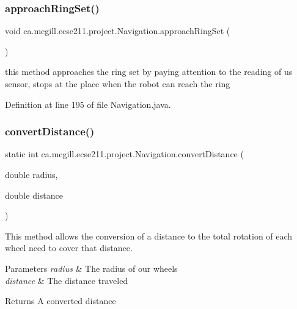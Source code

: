 \subsubsection{\texorpdfstring{approach\+Ring\+Set()}{approachRingSet()}}
{\footnotesize\ttfamily void ca.\+mcgill.\+ecse211.\+project.\+Navigation.\+approach\+Ring\+Set (\begin{DoxyParamCaption}{ }\end{DoxyParamCaption})}

this method approaches the ring set by paying attention to the reading of us sensor, stops at the place when the robot can reach the ring 

Definition at line 195 of file Navigation.\+java.

\mbox{\label{classca_1_1mcgill_1_1ecse211_1_1project_1_1_navigation_ac9e260bcd619ffa4820d7d0de7ea1c12}} 
\subsubsection{\texorpdfstring{convert\+Distance()}{convertDistance()}}
{\footnotesize\ttfamily static int ca.\+mcgill.\+ecse211.\+project.\+Navigation.\+convert\+Distance (\begin{DoxyParamCaption}\item[{double}]{radius,  }\item[{double}]{distance }\end{DoxyParamCaption})\hspace{0.3cm}{\ttfamily [static]}}

This method allows the conversion of a distance to the total rotation of each wheel need to cover that distance.


\begin{DoxyParams}{Parameters}
{\em radius} & The radius of our wheels \\
\hline
{\em distance} & The distance traveled \\
\hline
\end{DoxyParams}
\begin{DoxyReturn}{Returns}
A converted distance 
\end{DoxyReturn}


